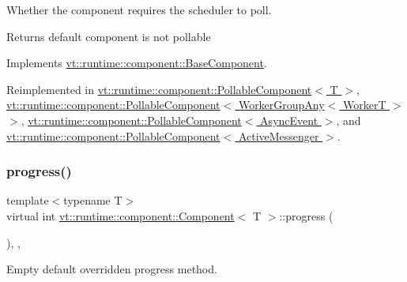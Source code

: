 Whether the component requires the scheduler to poll. 

\begin{DoxyReturn}{Returns}
default component is not pollable 
\end{DoxyReturn}


Implements \hyperlink{structvt_1_1runtime_1_1component_1_1_base_component_ab651a49e6d4d3d8ca9e82a6b4b10af66}{vt\+::runtime\+::component\+::\+Base\+Component}.



Reimplemented in \hyperlink{structvt_1_1runtime_1_1component_1_1_pollable_component_a8ad6cfbc184ed9862cae5304605fe025}{vt\+::runtime\+::component\+::\+Pollable\+Component$<$ T $>$}, \hyperlink{structvt_1_1runtime_1_1component_1_1_pollable_component_a8ad6cfbc184ed9862cae5304605fe025}{vt\+::runtime\+::component\+::\+Pollable\+Component$<$ Worker\+Group\+Any$<$ Worker\+T $>$ $>$}, \hyperlink{structvt_1_1runtime_1_1component_1_1_pollable_component_a8ad6cfbc184ed9862cae5304605fe025}{vt\+::runtime\+::component\+::\+Pollable\+Component$<$ Async\+Event $>$}, and \hyperlink{structvt_1_1runtime_1_1component_1_1_pollable_component_a8ad6cfbc184ed9862cae5304605fe025}{vt\+::runtime\+::component\+::\+Pollable\+Component$<$ Active\+Messenger $>$}.

\mbox{\label{structvt_1_1runtime_1_1component_1_1_component_a1dab11d9eb5bed8dfd5a3bb8fdf67f5a}} 
\subsubsection{\texorpdfstring{progress()}{progress()}}
{\footnotesize\ttfamily template$<$typename T$>$ \\
virtual int \hyperlink{structvt_1_1runtime_1_1component_1_1_component}{vt\+::runtime\+::component\+::\+Component}$<$ T $>$\+::progress (\begin{DoxyParamCaption}{ }\end{DoxyParamCaption})\hspace{0.3cm}{\ttfamily [inline]}, {\ttfamily [override]}, {\ttfamily [virtual]}}



Empty default overridden progress method. 

